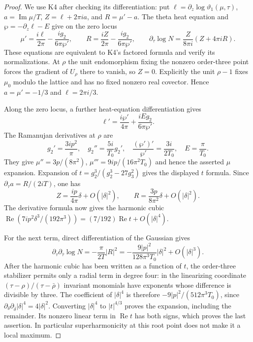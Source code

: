 \begin{proof}
We use K4 after checking its differentiation: put
$\ell=\partial_z\log\vartheta_1(\mu,\tau)$,
$a=\operatorname{Im}\mu/T$, $Z=\ell+2\pi ia$, and
$R=\mu'-a$. The theta heat equation and
$\wp=-\partial_z\ell-E$ give on the zero locus
\[
 \mu'=\frac{i\ell}{2\pi}-\frac{ig_2}{6\pi\wp'},\qquad
 R=\frac{iZ}{2\pi}-\frac{ig_2}{6\pi\wp'},\qquad
 \partial_\tau\log N=\frac{Z}{8\pi i}(Z+4\pi iR).
\]
These equations are equivalent to K4's factored formula and verify
its normalizations. At $\rho$ the unit endomorphism fixing the
nonzero order-three point forces the gradient of $U_\rho$ there to
vanish, so $Z=0$. Explicitly the unit $\rho-1$ fixes $\mu_0$ modulo
the lattice and has no fixed nonzero real covector. Hence
$a=\mu'=-1/3$ and $\ell=2\pi i/3$.

Along the zero locus, a further heat-equation differentiation gives
\[
 \ell'=\frac{i\wp'}{4\pi}+\frac{iEg_2}{6\pi\wp'}.
\]
The Ramanujan derivatives at $\rho$ are
\[
 g_2'=\frac{3ip^2}{\pi},\quad
 g_2''=\frac{5i}{T_0}g_2',\quad
 \frac{(\wp')'}{\wp'}=\frac{3i}{2T_0},\quad E=\frac\pi{T_0}.
\]
They give $\mu''=3p/(8\pi^2)$,
$\mu'''=9ip/(16\pi^2T_0)$ and hence the asserted $\mu$ expansion.
Expansion of $t=g_2^3/(g_2^3-27g_3^2)$ gives the displayed $t$
formula. Since $\partial_\tau a=R/(2iT)$, one has
\[
 Z=\frac{ip}{4\pi}\delta+O(|\delta|^2),\qquad
 R=\frac{3p}{8\pi^2}\delta+O(|\delta|^2).
\]
The derivative formula now gives the harmonic cubic
$\operatorname{Re}(7ip^2\delta^3/(192\pi^3))=(7/192)
\operatorname{Re}t+O(|\delta|^4)$.

For the next term, direct differentiation of the Gaussian gives
\[
 \partial_\tau\partial_{\bar\tau}\log N
       =-\frac\pi{2T}|R|^2
       =-\frac{9|p|^2}{128\pi^3T_0}|\delta|^2+O(|\delta|^3).
\]
After the harmonic cubic has been written as a function of $t$, the
order-three stabilizer permits only a radial term in degree four:
in the linearizing coordinate
$(\tau-\rho)/(\tau-\bar\rho)$ invariant monomials have exponents
whose difference is divisible by three. The coefficient of
$|\delta|^4$ is therefore $-9|p|^2/(512\pi^3T_0)$, since
$\partial_\delta\partial_{\bar\delta}|\delta|^4=4|\delta|^2$.
Converting $|\delta|^4$ to $|t|^{4/3}$ proves the expansion, including
the remainder. Its nonzero linear term in $\operatorname{Re}t$
has both signs, which proves the last assertion. In particular
superharmonicity at this root point does not make it a local maximum.
\end{proof}
